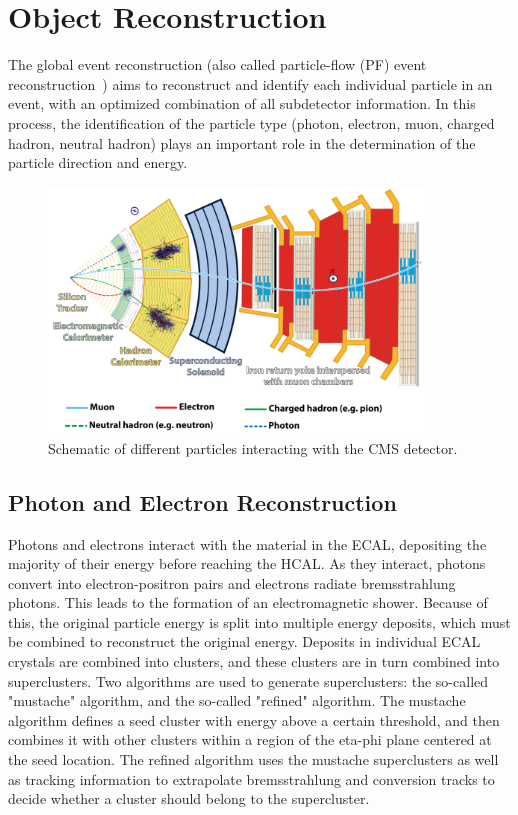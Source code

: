 \section{Object Reconstruction}
The global event reconstruction (also called particle-flow (PF) event reconstruction~\cite{CMS:2017yfk}) aims to reconstruct and identify each individual particle in an event, with an optimized combination of all subdetector information. In this process, the identification of the particle type (photon, electron, muon, charged hadron, neutral hadron) plays an important role in the determination of the particle direction and energy.

\begin{figure}
  \centering
   \includegraphics[width=0.9\textwidth]{fig/experiment/reconstruction/cms_detector.png}
	\caption{Schematic of different particles interacting with the CMS detector.}
\end{figure}

\subsection{Photon and Electron Reconstruction}
Photons and electrons interact with the material in the ECAL, depositing the majority of their energy before reaching the HCAL. As they interact, photons convert into 
electron-positron pairs and electrons radiate bremsstrahlung photons. This leads to the formation of an electromagnetic shower. Because of this, the original particle energy 
is split into multiple energy deposits, which must be combined to reconstruct the original energy. Deposits in individual ECAL crystals are combined into clusters, 
and these clusters are in turn combined into superclusters. Two algorithms are used to generate superclusters: the so-called "mustache" algorithm, and the so-called "refined" algorithm.
The mustache algorithm defines a seed cluster with energy above a certain threshold, and then combines it with other clusters within a region of the eta-phi plane centered at the 
seed location. The refined algorithm uses the mustache superclusters as well as tracking information to extrapolate bremsstrahlung and conversion tracks to decide whether a cluster should belong 
to the supercluster. 

